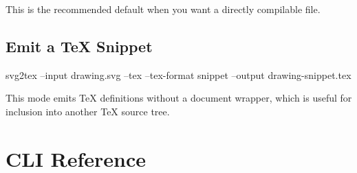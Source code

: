 \documentclass[11pt,a4paper]{article}
\begin{document}
This is the recommended default when you want a directly compilable file.

\subsection{Emit a TeX Snippet}

\begin{codeblock}
svg2tex --input drawing.svg --tex --tex-format snippet --output drawing-snippet.tex
\end{codeblock}

This mode emits TeX definitions without a document wrapper, which is useful for inclusion into
another TeX source tree.

\section{CLI Reference}
\end{document}

